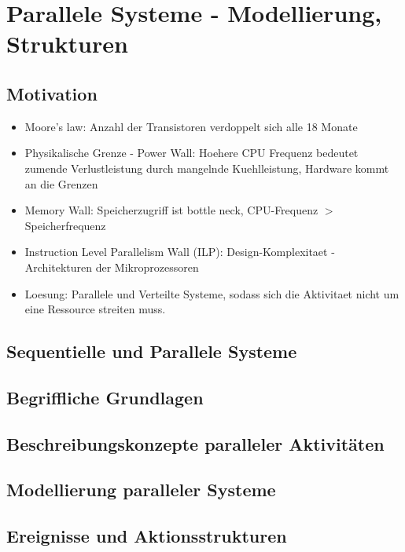 \section{Parallele Systeme - Modellierung, Strukturen}

\subsection{Motivation}

\begin{itemize}
	\setlength\itemsep{0em}
	\item Moore's law: Anzahl der Transistoren verdoppelt sich alle 18 Monate
	\item Physikalische Grenze - Power Wall: Hoehere CPU Frequenz bedeutet zumende Verlustleistung durch mangelnde Kuehlleistung, Hardware kommt an die Grenzen
	\item Memory Wall: Speicherzugriff ist bottle neck, CPU-Frequenz $>$ Speicherfrequenz
	\item Instruction Level Parallelism Wall (ILP): Design-Komplexitaet - Architekturen der Mikroprozessoren
	\item Loesung: Parallele und Verteilte Systeme, sodass sich die Aktivitaet nicht um eine Ressource streiten muss. 
\end{itemize}

\subsection{Sequentielle und Parallele Systeme}

\subsection{Begriffliche Grundlagen}

\subsection{Beschreibungskonzepte paralleler Aktivitäten}

\subsection{Modellierung paralleler Systeme}

\subsection{Ereignisse und Aktionsstrukturen}

